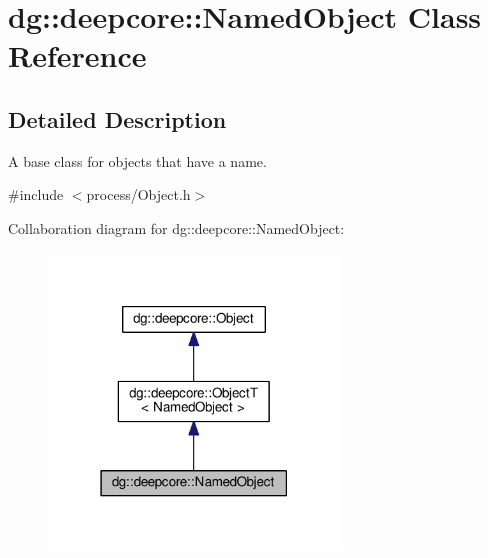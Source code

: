 \hypertarget{classdg_1_1deepcore_1_1_named_object}{}\section{dg\+:\+:deepcore\+:\+:Named\+Object Class Reference}
\label{classdg_1_1deepcore_1_1_named_object}


\subsection{Detailed Description}
A base class for objects that have a name. 

{\ttfamily \#include $<$process/\+Object.\+h$>$}



Collaboration diagram for dg\+:\+:deepcore\+:\+:Named\+Object\+:
\nopagebreak
\begin{figure}[H]
\begin{center}
\leavevmode
\includegraphics[width=219pt]{classdg_1_1deepcore_1_1_named_object__coll__graph}
\end{center}
\end{figure}
